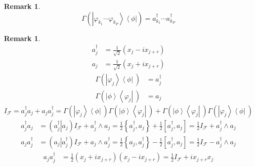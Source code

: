 \documentclass[aps,preprint]{revtex4}%
\newtheorem{remark}[theorem]{Remark}
\begin{document}
\begin{remark}%
\begin{equation}
\Gamma\left(  \left\vert \varphi_{k_{1}}\cdots\varphi_{k_{P}}\right\rangle
\left\langle \phi\right\vert \right)  =a_{k_{1}}^{\dagger}\cdots a_{k_{P}%
}^{\dagger}%
\end{equation}

\end{remark}

\begin{remark}%
\begin{align}
a_{j}^{\dagger}  &  =\frac{1}{\sqrt{2}}\left(  x_{j}-ix_{j+r}\right) \\
a_{j}  &  =\frac{1}{\sqrt{2}}\left(  x_{j}+ix_{j+r}\right)
\end{align}%
\begin{align}
\Gamma\left(  \left\vert \varphi_{j}\right\rangle \left\langle \phi\right\vert
\ \right)   &  =a_{j}^{\dagger}\\
\Gamma\left(  \left\vert \phi\right\rangle \left\langle \varphi_{j}\right\vert
\ \right)   &  =a_{j}%
\end{align}%
\begin{equation}
I_{\mathcal{F}}=a_{j}^{\dagger}a_{j}+a_{j}a_{j}^{\dagger}=\Gamma\left(
\left\vert \varphi_{j}\right\rangle \left\langle \phi\right\vert \ \right)
\Gamma\left(  \left\vert \phi\right\rangle \left\langle \varphi_{j}\right\vert
\ \right)  +\Gamma\left(  \left\vert \phi\right\rangle \left\langle
\varphi_{j}\right\vert \ \right)  \Gamma\left(  \left\vert \varphi
_{j}\right\rangle \left\langle \phi\right\vert \ \right)
\end{equation}%
\begin{align}
a_{j}^{\dagger}a_{j}  &  =\left(  \left.  a_{j}^{\dagger}\right\vert
a_{j}\right)  I_{\mathcal{F}}+a_{j}^{\dagger}\wedge a_{j}=\frac{1}{2}\left\{
a_{j}^{\dagger},a_{j}\right\}  +\frac{1}{2}\left[  a_{j}^{\dagger}%
,a_{j}\right]  =\frac{1}{2}I_{\mathcal{F}}+a_{j}^{\dagger}\wedge a_{j}\\
a_{j}a_{j}^{\dagger}  &  =\left(  \left.  a_{j}\right\vert a_{j}^{\dagger
}\right)  I_{\mathcal{F}}+a_{j}\wedge a_{j}^{\dagger}=\frac{1}{2}\left\{
a_{j},a_{j}^{\dagger}\right\}  -\frac{1}{2}\left[  a_{j}^{\dagger}%
,a_{j}\right]  =\frac{1}{2}I_{\mathcal{F}}-a_{j}^{\dagger}\wedge a_{j}%
\end{align}%
\begin{align}
a_{j}a_{j}^{\dagger}  &  =\frac{1}{2}\left(  x_{j}+ix_{j+r}\right)  \left(
x_{j}-ix_{j+r}\right)  =\frac{1}{2}I_{\mathcal{F}}+ix_{j+r}x_{j}\\

\end{align}
\end{remark}
\end{document}
